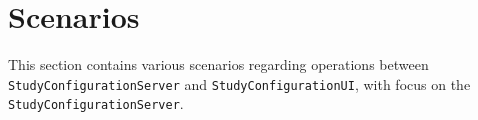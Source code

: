 
\section{Scenarios}

\newcommand{\researcher}{\texttt{Researcher}\xspace}
\newcommand{\clientside}{\texttt{StudyConfigurationUI}\xspace}
\newcommand{\invalidUser}{\texttt{InvalidUser}\xspace}
\newcommand{\serverside}{\texttt{StudyConfigurationServer}\xspace}
\newcommand{\incident}{\texttt{Incident}\xspace}
\newcommand{\reportemergency}{\texttt{ReportEmergency}\xspace}
\newcommand{\openincident}{\texttt{OpenIncident}\xspace}


This section contains various scenarios regarding operations between \serverside and \clientside, with focus on the \serverside.

